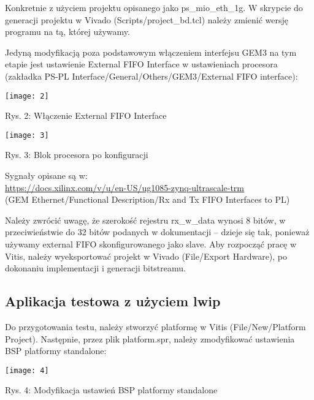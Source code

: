 \documentclass[11pt, letterpaper]{article}
\begin{document}
\vspace{5mm}
\noindent Konkretnie z użyciem projektu opisanego jako ps\_mio\_eth\_1g. W skrypcie do generacji projektu w Vivado (Scripts/project\_bd.tcl) należy zmienić wersję programu na tą, której używamy.

\vspace{5mm}
Jedyną modyfikacją poza podstawowym włączeniem interfejsu GEM3 na tym etapie jest ustawienie External FIFO Interface w ustawieniach procesora (zakładka PS-PL Interface/General/Others/GEM3/External FIFO interface):


\vspace{10mm}
\texttt{[image: 2]}
\begin{center}
\caption{Rys. 2: Włączenie External FIFO Interface}
\end{center}

\pagebreak

\texttt{[image: 3]}
\begin{center}
\caption{Rys. 3: Blok procesora po konfiguracji}
\end{center}

\vspace{10mm}

\noindent Sygnały opisane są w:
\\
\url{https://docs.xilinx.com/v/u/en-US/ug1085-zynq-ultrascale-trm}
\\
(GEM Ethernet/Functional Description/Rx and Tx FIFO Interfaces to PL)
\linebreak

\vspace{2mm}
Należy zwrócić uwagę, że szerokość rejestru rx\_w\_data wynosi 8 bitów, w przeciwieństwie do 32 bitów podanych w dokumentacji – dzieje się tak, ponieważ używamy external FIFO skonfigurowanego jako slave.
Aby rozpocząć pracę w Vitis, należy wyeksportować projekt w Vivado (File/Export Hardware), po dokonaniu implementacji i generacji bitstreamu.
\subsection{Aplikacja testowa z użyciem lwip}
Do przygotowania testu, należy stworzyć platformę w Vitis (File/New/Platform Project). Następnie, przez plik platform.spr, należy zmodyfikować ustawienia BSP platformy standalone:

\texttt{[image: 4]}
\begin{center}
\caption{Rys. 4: Modyfikacja ustawień BSP platformy standalone}
\end{center}
\end{document}
